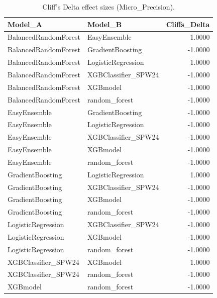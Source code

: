 \begin{table}[t]
\centering
\begin{tabular}{llr}
\toprule
Model_A & Model_B & Cliffs_Delta \\
\midrule
BalancedRandomForest & EasyEnsemble & 1.0000 \\
BalancedRandomForest & GradientBoosting & -1.0000 \\
BalancedRandomForest & LogisticRegression & 1.0000 \\
BalancedRandomForest & XGBClassifier_SPW24 & -1.0000 \\
BalancedRandomForest & XGBmodel & -1.0000 \\
BalancedRandomForest & random_forest & -1.0000 \\
EasyEnsemble & GradientBoosting & -1.0000 \\
EasyEnsemble & LogisticRegression & -1.0000 \\
EasyEnsemble & XGBClassifier_SPW24 & -1.0000 \\
EasyEnsemble & XGBmodel & -1.0000 \\
EasyEnsemble & random_forest & -1.0000 \\
GradientBoosting & LogisticRegression & 1.0000 \\
GradientBoosting & XGBClassifier_SPW24 & -1.0000 \\
GradientBoosting & XGBmodel & -1.0000 \\
GradientBoosting & random_forest & -1.0000 \\
LogisticRegression & XGBClassifier_SPW24 & -1.0000 \\
LogisticRegression & XGBmodel & -1.0000 \\
LogisticRegression & random_forest & -1.0000 \\
XGBClassifier_SPW24 & XGBmodel & 1.0000 \\
XGBClassifier_SPW24 & random_forest & -1.0000 \\
XGBmodel & random_forest & -1.0000 \\
\bottomrule
\end{tabular}
\caption{Cliff's Delta effect sizes (Micro_Precision).}
\label{tab:cliffs_Micro_Precision}
\end{table}